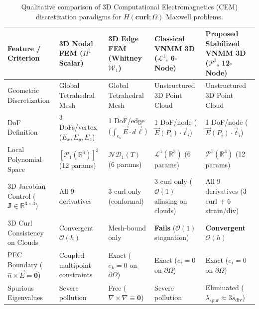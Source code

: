 \documentclass[preprint,12pt]{elsarticle}
\newcommand{\curl}{\nabla \times}
\newcommand{\grad}{\nabla}
\newcommand{\R}{\mathbb{R}}
\newcommand{\Hcurl}{H(\mathbf{curl};\Omega)}
\begin{document}
\begin{table}[htbp]
\centering
\caption{Qualitative comparison of 3D Computational Electromagnetics (CEM) discretization paradigms for $\Hcurl$ Maxwell problems.}
\label{tab:cem_comparison_3d}
\footnotesize
\begin{tabular}{p{3.0cm} p{2.3cm} p{2.3cm} p{2.3cm} p{2.8cm}}
\toprule
\textbf{Feature / Criterion} & \textbf{3D Nodal FEM} ($H^1$ Scalar) & \textbf{3D Edge FEM} (Whitney $\mathcal{W}_1$) & \textbf{Classical VNMM 3D} ($\mathcal{L}^1$, 6-Node) & \textbf{Proposed Stabilized VNMM 3D} ($\mathcal{P}^1$, 12-Node) \\
\midrule
Geometric Discretization & Global Tetrahedral Mesh & Global Tetrahedral Mesh & Unstructured 3D Point Cloud & Unstructured 3D Point Cloud \\
DoF Definition & 3 DoFs/vertex ($E_x,E_y,E_z$) & 1 DoF/edge ($\int_{e_k}\vec{E}\cdot d\vec{\ell}$) & 1 DoF/node ($\vec{E}(P_i)\cdot\vec{t}_i$) & 1 DoF/node ($\vec{E}(P_i)\cdot\vec{t}_i$) \\
Local Polynomial Space & $[\mathcal{P}_1(\R^3)]^3$ (12 params) & $\mathcal{ND}_1(T)$ (6 params) & $\mathcal{L}^1(\R^3)$ (6 params) & $\mathcal{P}^1(\R^3)$ (12 params) \\
3D Jacobian Control ($\mathbf{J} \in \R^{3\times 3}$) & All 9 derivatives & 3 curl only (conformal) & 3 curl only ($\mathcal{O}(1)$ aliasing on clouds) & All 9 derivatives (3 curl + 6 strain/div) \\
3D Curl Consistency on Clouds & Convergent $\mathcal{O}(h)$ & Mesh-bound only & \textbf{Fails} ($\mathcal{O}(1)$ stagnation) & \textbf{Convergent} $\mathcal{O}(h)$ \\
PEC Boundary ($\hat{n}\times\vec{E}=\mathbf{0}$) & Coupled multipoint constraints & Exact ($e_k=0$ on $\partial\Omega$) & Exact ($e_i=0$ on $\partial\Omega$) & Exact ($e_i=0$ on $\partial\Omega$) \\
Spurious Eigenvalues & Severe pollution & Free ($\curl\grad\equiv\mathbf{0}$) & Severe pollution & Eliminated ($\lambda_{\text{spur}}\approx 3 s_{\text{div}}$) \\
\bottomrule
\end{tabular}
\end{table}
\end{document}
